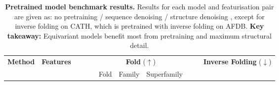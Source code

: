 \begin{table}[!ht]
\caption{\textbf{Pretrained model benchmark results.} Results for each model and featurisation pair are given as: \colorbox{orange!20}{no pretraining} / \colorbox{blue!20}{sequence denoising} / \colorbox{green!20}{structure denoising}%
, except for inverse folding on CATH, which is pretrained with \colorbox{purple!20}{inverse folding} on AFDB. 
\textbf{Key takeaway:} Equivariant models benefit most from pretraining and maximum structural detail.
}
\label{tab:pre_trained_graph_classification_results}

\begin{adjustbox}{max width=\linewidth}
\begin{tabular}{cllcccccccc}

\toprule

\multirow{2}{*}{\textbf{Method}} & \multicolumn{1}{c}{\multirow{2}{*}{\textbf{Features}}} & \multicolumn{1}{c}{} & 
& & \multicolumn{3}{c}{\textbf{Fold} ($\uparrow$)} & 
& & \multirow{2}{*}{\textbf{Inverse Folding} ($\downarrow$)}  \\
\cmidrule{6-8}
 & \multicolumn{1}{c}{} &  & \multicolumn{1}{c}{} & \multicolumn{1}{c}{} & Fold & Family & Superfamily &  & \\





\end{tabular}
\end{adjustbox}
\end{table}
